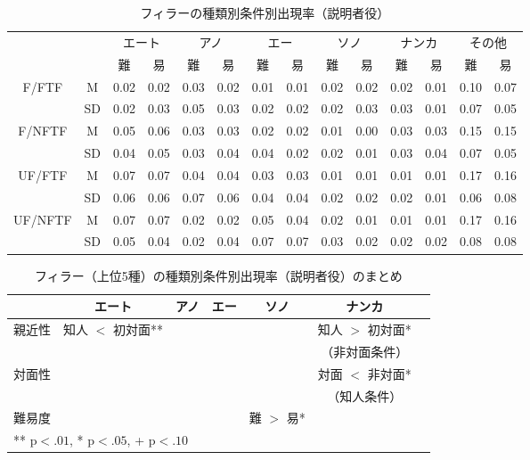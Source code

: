 \documentclass[japanese]{jnlp_1.3a}
\begin{document}
\begin{table}[t]
\caption{フィラーの種類別条件別出現率（説明者役）} \label{filler_kind}
\begin{center}
\footnotesize
\begin{tabular}{c c c c c c c c c c c c c c} \hline
 &  & \multicolumn{2}{c}{エート} &  \multicolumn{2}{c}{アノ} & \multicolumn{2}{c}{エー} &  \multicolumn{2}{c}{ソノ} &  \multicolumn{2}{c}{ナンカ} & \multicolumn{2}{c}{その他}\\
 &  & 難 & 易 & 難 & 易 & 難 & 易 & 難 & 易 & 難 & 易 & 難 & 易\\ \hline
F/FTF & M & 0.02  & 0.02  & 0.03  & 0.02  & 0.01  & 0.01  & 0.02  & 0.02  & 0.02  & 0.01  & 0.10  & 0.07 \\
 & SD &  0.02  &  0.03  &  0.05  &  0.03  &  0.02  &  0.02  &  0.02  &  0.03  &  0.03  &  0.01  &  0.07  &  0.05 \\
F/NFTF & M & 0.05  & 0.06  & 0.03  & 0.03  & 0.02  & 0.02  & 0.01  & 0.00  & 0.03  & 0.03  & 0.15  & 0.15 \\
 & SD &  0.04  &  0.05  &  0.03  &  0.04  &  0.04  &  0.02  &  0.02  &  0.01  &  0.03  &  0.04  &  0.07  &  0.05 \\
UF/FTF & M & 0.07  & 0.07  & 0.04  & 0.04  & 0.03  & 0.03  & 0.01  & 0.01  & 0.01  & 0.01  & 0.17  & 0.16 \\
 & SD &  0.06  &  0.06  &  0.07  &  0.06  &  0.04  &  0.04  &  0.02  &  0.02  &  0.02  &  0.01  &  0.06  &  0.08 \\
UF/NFTF & M & 0.07  & 0.07  & 0.02  & 0.02  & 0.05  & 0.04  & 0.02  & 0.01  & 0.01  & 0.01  & 0.17  & 0.16 \\
 & SD &  0.05  &  0.04  &  0.02  &  0.04  &  0.07  &  0.07  &  0.03  &  0.02  &  0.02  &  0.02  & 0.08  & 0.08 \\ \hline
\end{tabular}
\end{center}
\end{table}

\begin{table}[t]
\caption{フィラー（上位5種）の種類別条件別出現率（説明者役）のまとめ} \label{filler_trend}
\begin{center}
\scriptsize
\begin{tabular}{c c c c c c c} \hline
 & エート & アノ & エー & ソノ & ナンカ\\ \hline
\multirow{2}{13mm}{親近性} & \multirow{2}{21mm}{知人 $<$ 初対面**} & & & & 知人 $>$ 初対面*\\
 & & & & & （非対面条件）\\ 
\multirow{2}{13mm}{対面性} &  &  &  &  & 対面 $<$ 非対面*\\
 & & & & &  （知人条件）\\
\multirow{2}{13mm}{難易度} &  & & & \multirow{2}{11mm}{難 $>$ 易*} & \\
 & & & & &\\ \hline
\multicolumn{4}{l}{** $\mathrm{p} < .01$, * $\mathrm{p} < .05$, + $\mathrm{p} < .10$} & & \\
\end{tabular}
\end{center}
\end{table}
\end{document}
